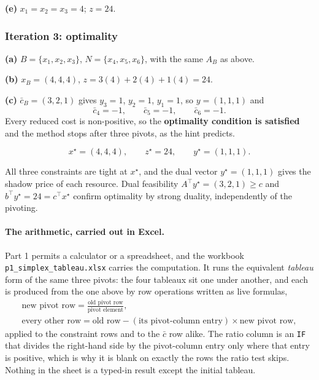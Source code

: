 \documentclass[11pt]{article}
\theoremstyle{definition}
\theoremstyle{plain}
\begin{document}
\textbf{(e)} $x_1 = x_2 = x_3 = 4$; $z = 24$.

\subsubsection*{Iteration 3: optimality}

\textbf{(a)} $B = \{x_1,x_2,x_3\}$, $N = \{x_4,x_5,x_6\}$, with the
same $A_B$ as above.

\textbf{(b)} $x_B = (4,4,4)$, $z = 3(4)+2(4)+1(4) = 24$.

\textbf{(c)} $\bar{c}_B = (3,2,1)$ gives $y_3 = 1$, $y_2 = 1$,
$y_1 = 1$, so $y = (1,1,1)$ and
\[
  \bar{c}_4 = -1, \qquad \bar{c}_5 = -1, \qquad \bar{c}_6 = -1 .
\]
Every reduced cost is non-positive, so the \textbf{optimality condition
is satisfied} and the method stops after three pivots, as the hint
predicts.

\[
  \boxed{\;x^\star = (4,4,4), \qquad z^\star = 24,
    \qquad y^\star = (1,1,1). \;}
\]

All three constraints are tight at $x^\star$, and the dual vector
$y^\star = (1,1,1)$ gives the shadow price of each resource. Dual
feasibility $A^{\!\top}y^\star = (3,2,1) \ge c$ and
$b^{\!\top}y^\star = 24 = c^{\!\top}x^\star$ confirm optimality by strong
duality, independently of the pivoting.

\paragraph{The arithmetic, carried out in Excel.} Part 1 permits a
calculator or a spreadsheet, and the workbook
\texttt{p1\_simplex\_tableau.xlsx} carries the computation. It runs the
equivalent \emph{tableau} form of the same three pivots: the four
tableaux sit one under another, and each is produced from the one above
by row operations written as live formulas,
\begin{gather*}
  \text{new pivot row} = \frac{\text{old pivot row}}{\text{pivot element}},\\
  \text{every other row} = \text{old row}
    - (\text{its pivot-column entry}) \times \text{new pivot row},
\end{gather*}
applied to the constraint rows and to the $\bar{c}$ row alike. The ratio
column is an \texttt{IF} that divides the right-hand side by the
pivot-column entry only where that entry is positive, which is why it is
blank on exactly the rows the ratio test skips. Nothing in the sheet is
a typed-in result except the initial tableau.
\end{document}
